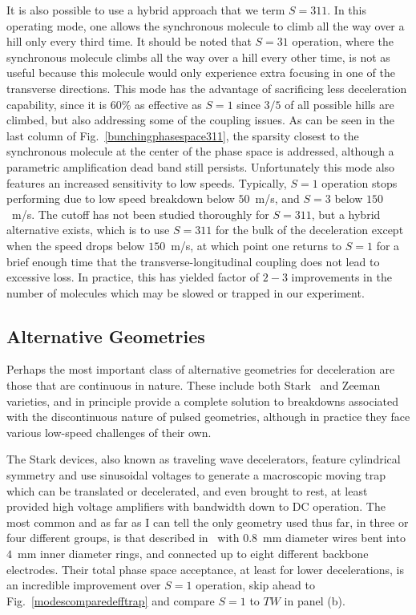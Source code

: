 It is also possible to use a hybrid approach that we term $S=311$.
In this operating mode, one allows the synchronous molecule to climb all the way over a hill only every third time.
It should be noted that $S=31$ operation, where the synchronous molecule climbs all the way over a hill every other time, is not as useful because this molecule would only experience extra focusing in one of the transverse directions.
This mode has the advantage of sacrificing less deceleration capability, since it is $60\%$ as effective as $S=1$ since $3/5$ of all possible hills are climbed, but also addressing some of the coupling issues.
As can be seen in the last column of Fig.~\ref{bunchingphasespace311}, the sparsity closest to the synchronous molecule at the center of the phase space is addressed, although a parametric amplification dead band still persists.
Unfortunately this mode also features an increased sensitivity to low speeds.
Typically, $S=1$ operation stops performing due to low speed breakdown below $50$~m/s, and $S=3$ below $150$~m/s.
The cutoff has not been studied thoroughly for $S=311$, but a hybrid alternative exists, which is to use $S=311$ for the bulk of the deceleration except when the speed drops below $150$~m/s, at which point one returns to $S=1$ for a brief enough time that the transverse-longitudinal coupling does not lead to excessive loss.
In practice, this has yielded factor of $2-3$ improvements in the number of molecules which may be slowed or trapped in our experiment.

\subsection{Alternative Geometries}

Perhaps the most important class of alternative geometries for deceleration are those that are continuous in nature. 
These include both Stark~\cite{Osterwalder2010} and Zeeman~\cite{Narevicius2008} varieties, and in principle provide a complete solution to breakdowns associated with the discontinuous nature of pulsed geometries, although in practice they face various low-speed challenges of their own.

The Stark devices, also known as traveling wave decelerators, feature cylindrical symmetry and use sinusoidal voltages to generate a macroscopic moving trap which can be translated or decelerated, and even brought to rest, at least provided high voltage amplifiers with bandwidth down to DC operation.
The most common and as far as I can tell the only geometry used thus far, in three or four different groups, is that described in~\cite{Osterwalder2010} with $0.8$~mm diameter wires bent into $4$~mm inner diameter rings, and connected up to eight different backbone electrodes.
Their total phase space acceptance, at least for lower decelerations, is an incredible improvement over $S=1$ operation, skip ahead to Fig.~\ref{modescomparedefftrap} and compare $S=1$ to $TW$ in panel (b).

